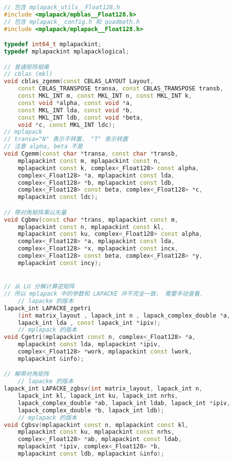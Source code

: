 \begin{lstlisting}[language=cpp]
// 包含 mplapack_utils__Float128.h
#include <mplapack/mpblas__Float128.h>
// 包含 mplapack__config.h 和 quadmath.h
#include <mplapack/mplapack__Float128.h>

typedef int64_t mplapackint;
typedef mplapackint mplapacklogical;

// 普通矩阵相乘
// cblas (mkl)
void cblas_zgemm(const CBLAS_LAYOUT Layout,
    const CBLAS_TRANSPOSE transa, const CBLAS_TRANSPOSE transb,
    const MKL_INT m, const MKL_INT n, const MKL_INT k,
    const void *alpha, const void *a,
    const MKL_INT lda, const void *b,
    const MKL_INT ldb, const void *beta,
    void *c, const MKL_INT ldc);
// mplapack
// transa="N" 表示不转置， "T" 表示转置
// 注意 alpha, beta 不是 
void Cgemm(const char *transa, const char *transb,
    mplapackint const m, mplapackint const n,
    mplapackint const k, complex<_Float128> const alpha,
    complex<_Float128> *a, mplapackint const lda,
    complex<_Float128> *b, mplapackint const ldb,
    complex<_Float128> const beta, complex<_Float128> *c,
    mplapackint const ldc);

// 带对角矩阵乘以矢量
void Cgbmv(const char *trans, mplapackint const m,
    mplapackint const n, mplapackint const kl,
    mplapackint const ku, complex<_Float128> const alpha,
    complex<_Float128> *a, mplapackint const lda,
    complex<_Float128> *x, mplapackint const incx,
    complex<_Float128> const beta, complex<_Float128> *y,
    mplapackint const incy);


// 从 LU 分解计算逆矩阵
// 所以 mplapack 中的参数和 LAPACKE 并不完全一致， 需要手动查看．
    // lapacke 的版本
lapack_int LAPACKE_zgetri
    (int matrix_layout , lapack_int n , lapack_complex_double *a,
    lapack_int lda , const lapack_int *ipiv);
    // mplapack 的版本
void Cgetri(mplapackint const n, complex<_Float128> *a,
    mplapackint const lda, mplapackint *ipiv,
    complex<_Float128> *work, mplapackint const lwork,
    mplapackint &info);

// 解带对角矩阵
    // lapacke 的版本
lapack_int LAPACKE_zgbsv(int matrix_layout, lapack_int n,
    lapack_int kl, lapack_int ku, lapack_int nrhs,
    lapack_complex_double *ab, lapack_int ldab, lapack_int *ipiv,
    lapack_complex_double *b, lapack_int ldb);
    // mplapack 的版本
void Cgbsv(mplapackint const n, mplapackint const kl,
    mplapackint const ku, mplapackint const nrhs,
    complex<_Float128> *ab, mplapackint const ldab,
    mplapackint *ipiv, complex<_Float128> *b,
    mplapackint const ldb, mplapackint &info);
\end{lstlisting}
